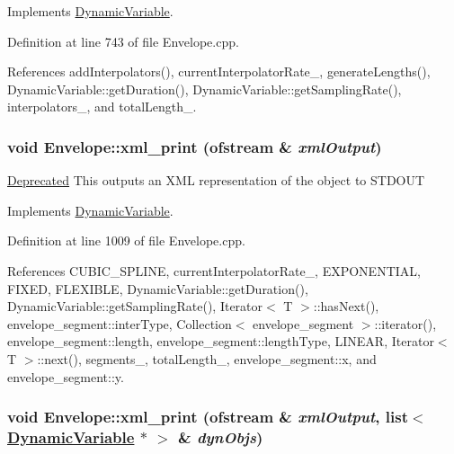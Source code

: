 Implements \hyperlink{classDynamicVariable_a3}{Dynamic\-Variable}.

Definition at line 743 of file Envelope.cpp.

References add\-Interpolators(), current\-Interpolator\-Rate\_\-, generate\-Lengths(), Dynamic\-Variable::get\-Duration(), Dynamic\-Variable::get\-Sampling\-Rate(), interpolators\_\-, and total\-Length\_\-.\hypertarget{classEnvelope_a30}{
\subsubsection[xml\_\-print]{\setlength{\rightskip}{0pt plus 5cm}void Envelope::xml\_\-print (ofstream \& {\em xml\-Output})}}
\label{classEnvelope_a30}


\begin{Desc}
\item[\hyperlink{deprecated__deprecated000014}{Deprecated}]This outputs an XML representation of the object to STDOUT \end{Desc}


Implements \hyperlink{classDynamicVariable_a12}{Dynamic\-Variable}.

Definition at line 1009 of file Envelope.cpp.

References CUBIC\_\-SPLINE, current\-Interpolator\-Rate\_\-, EXPONENTIAL, FIXED, FLEXIBLE, Dynamic\-Variable::get\-Duration(), Dynamic\-Variable::get\-Sampling\-Rate(), Iterator$<$ T $>$::has\-Next(), envelope\_\-segment::inter\-Type, Collection$<$ envelope\_\-segment $>$::iterator(), envelope\_\-segment::length, envelope\_\-segment::length\-Type, LINEAR, Iterator$<$ T $>$::next(), segments\_\-, total\-Length\_\-, envelope\_\-segment::x, and envelope\_\-segment::y.\hypertarget{classEnvelope_a29}{
\subsubsection[xml\_\-print]{\setlength{\rightskip}{0pt plus 5cm}void Envelope::xml\_\-print (ofstream \& {\em xml\-Output}, list$<$ \hyperlink{classDynamicVariable}{Dynamic\-Variable} $\ast$ $>$ \& {\em dyn\-Objs})}}
\label{classEnvelope_a29}


